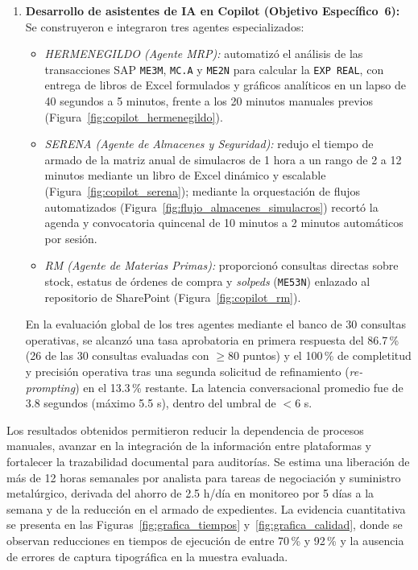 \begin{enumerate}
    \item \textbf{Desarrollo de asistentes de IA en Copilot (Objetivo Específico~6):} Se construyeron e integraron tres agentes especializados:
    \begin{itemize}
        \item \emph{HERMENEGILDO (Agente MRP):} automatizó el análisis de las transacciones SAP \texttt{ME3M}, \texttt{MC.A} y \texttt{ME2N} para calcular la \texttt{EXP REAL}, con entrega de libros de Excel formulados y gráficos analíticos en un lapso de 40 segundos a 5 minutos, frente a los 20 minutos manuales previos (Figura~\ref{fig:copilot_hermenegildo}).
        \item \emph{SERENA (Agente de Almacenes y Seguridad):} redujo el tiempo de armado de la matriz anual de simulacros de 1 hora a un rango de 2 a 12 minutos mediante un libro de Excel dinámico y escalable (Figura~\ref{fig:copilot_serena}); mediante la orquestación de flujos automatizados (Figura~\ref{fig:flujo_almacenes_simulacros}) recortó la agenda y convocatoria quincenal de 10 minutos a 2 minutos automáticos por sesión.
        \item \emph{RM (Agente de Materias Primas):} proporcionó consultas directas sobre stock, estatus de órdenes de compra y \emph{solpeds} (\texttt{ME53N}) enlazado al repositorio de SharePoint (Figura~\ref{fig:copilot_rm}).
    \end{itemize}
    En la evaluación global de los tres agentes mediante el banco de 30 consultas operativas, se alcanzó una tasa aprobatoria en primera respuesta del 86.7\,\% (26 de las 30 consultas evaluadas con $\ge 80$ puntos) y el 100\,\% de completitud y precisión operativa tras una segunda solicitud de refinamiento (\emph{re-prompting}) en el 13.3\,\% restante. La latencia conversacional promedio fue de 3.8 segundos (máximo 5.5 s), dentro del umbral de $<6$ s.
\end{enumerate}

Los resultados obtenidos permitieron reducir la dependencia de procesos manuales, avanzar en la integración de la información entre plataformas y fortalecer la trazabilidad documental para auditorías. Se estima una liberación de más de 12 horas semanales por analista para tareas de negociación y suministro metalúrgico, derivada del ahorro de 2.5 h/día en monitoreo por 5 días a la semana y de la reducción en el armado de expedientes. La evidencia cuantitativa se presenta en las Figuras~\ref{fig:grafica_tiempos} y~\ref{fig:grafica_calidad}, donde se observan reducciones en tiempos de ejecución de entre 70\,\% y 92\,\% y la ausencia de errores de captura tipográfica en la muestra evaluada.

